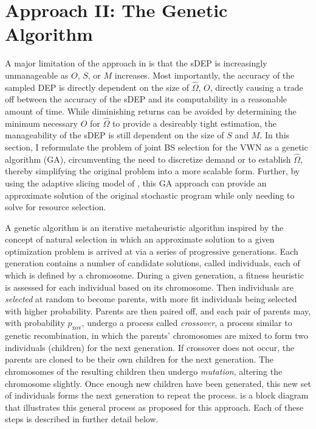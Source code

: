 \documentclass[12pt,dvipsnames]{report}
\begin{document}
\section{Approach II: The Genetic Algorithm} \label{sec:ga}

A major limitation of the approach in  is that the sDEP is increasingly unmanageable as $O$, $S$, or $M$ increases.  Most importantly, the accuracy of the sampled DEP is directly dependent on the size of $\hat{\Omega}$, $O$, directly causing a trade off between the accuracy of the sDEP and its computability in a reasonable amount of time.  While diminishing returns can be avoided by determining the minimum necessary $O$ for $\hat{\Omega}$ to provide a desireably tight estimation, the manageability of the sDEP is still dependent on the size of $S$ and $M$.  In this section, I reformulate the problem of joint BS selection for the VWN as a genetic algorithm (GA), circumventing the need to discretize demand or to establish $\hat{\Omega}$, thereby simplifying the original problem into a more scalable form.  Further, by using the adaptive slicing model of , this GA approach can provide an approximate solution of the original stochastic program while only needing to solve for resource selection.

A genetic algorithm is an iterative metaheuristic algorithm inspired by the concept of natural selection in which an approximate solution to a given optimization problem is arrived at via a series of progressive generations.  Each generation contains a number of candidate solutions, called individuals, each of which is defined by a chromosome.  During a given generation, a fitness heuristic is assessed for each individual based on its chromosome.  Then individuals are \emph{selected} at random to become parents, with more fit individuals being selected with higher probability.  Parents are then paired off, and each pair of parents may, with probability $p_\text{xov}$, undergo a process called \emph{crossover}, a process similar to genetic recombination, in which the parents' chromosomes are mixed to form two individuals (children) for the next generation.  If crossover does not occur, the parents are cloned to be their own children for the next generation.  The chromosomes of the resulting children then undergo \emph{mutation}, altering the chromosome slightly.  Once enough new children have been generated, this new set of individuals forms the next generation to repeat the process.   is a block diagram that illustrates this general process as proposed for this approach.  Each of these steps is described in further detail below.
\end{document}
